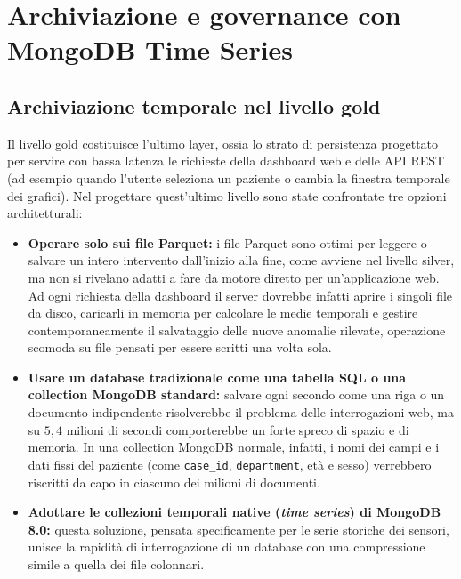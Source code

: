 \chapter{Archiviazione e governance con MongoDB Time Series}

\section{Archiviazione temporale nel livello gold}
Il livello gold costituisce l'ultimo layer, ossia lo strato di persistenza progettato per servire con bassa latenza le richieste della dashboard web e delle API REST (ad esempio quando l'utente seleziona un paziente o cambia la finestra temporale dei grafici). Nel progettare quest'ultimo livello sono state confrontate tre opzioni architetturali: 
\begin{itemize}
    \item \textbf{Operare solo sui file Parquet:} i file Parquet sono ottimi per leggere o salvare un intero intervento dall'inizio alla fine, come avviene nel livello silver, ma non si rivelano adatti a fare da motore diretto per un'applicazione web. Ad ogni richiesta della dashboard il server dovrebbe infatti aprire i singoli file da disco, caricarli in memoria per calcolare le medie temporali e gestire contemporaneamente il salvataggio delle nuove anomalie rilevate, operazione scomoda su file pensati per essere scritti una volta sola.    \item \textbf{Usare un database tradizionale come una tabella SQL o una collection MongoDB standard:} salvare ogni secondo come una riga o un documento indipendente risolverebbe il problema delle interrogazioni web, ma su $5,4$ milioni di secondi comporterebbe un forte spreco di spazio e di memoria. In una collection MongoDB normale, infatti, i nomi dei campi e i dati fissi del paziente (come \texttt{case\_id}, \texttt{department}, et\`a e sesso) verrebbero riscritti da capo in ciascuno dei milioni di documenti.    \item \textbf{Adottare le collezioni temporali native (\textit{time series}) di MongoDB 8.0:} questa soluzione, pensata specificamente per le serie storiche dei sensori, unisce la rapidit\`a di interrogazione di un database con una compressione simile a quella dei file colonnari.\end{itemize}

